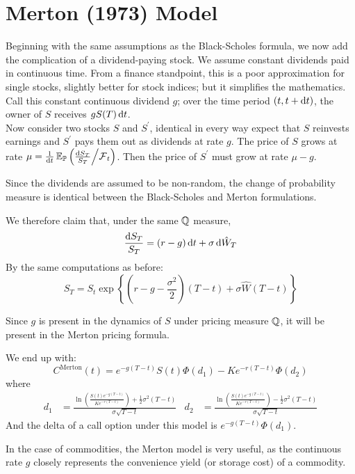\documentclass[11pt]{article}
\begin{document}
\section{Merton (1973) Model}
Beginning with the same assumptions as the Black-Scholes formula, we now add the complication of a dividend-paying stock. We assume constant dividends paid in continuous time. From a finance standpoint, this is a poor approximation for single stocks, slightly better for stock indices; but it simplifies the mathematics. Call this constant continuous dividend $g$; over the time period $(t, t + \dif t)$, the owner of $S$ receives $gS(T)\dif t$.\\

Now consider two stocks $S$ and $S^\prime$, identical in every way expect that $S$ reinvests earnings and $S^\prime$ pays them out as dividends at rate $g$. The price of $S$ grows at rate $\mu = \frac{1}{\dif t} \Exp_{\Pmeas} \left( \frac{\dif S_T}{S_T} \middle/ \Filtr_t\right)$. Then the price of $S^\prime$ must grow at rate $\mu  - g$.

\begin{remark}
Since the dividends are assumed to be non-random, the change of probability measure is identical between the Black-Scholes and Merton formulations.
\end{remark}
We therefore claim that, under the same $\operatorname{\mathbb Q}$ measure,
$$ \frac{\dif S_T}{S_T} = (r-g)\dif t + \sigma \dif \hat{W}_T$$
By the same computations as before:
$$S_T = S_t \exp \left\{ \left( r - g - \frac{\sigma^2}{2}\right)(T-t) + \sigma \hat{W}(T-t)\right\} $$
\begin{remark}
Since $g$ is present in the dynamics of $S$ under pricing measure $\operatorname{\mathbb Q}$, it will be present in the Merton pricing formula.
\end{remark}
We end up with:
$$C^{\text{Merton}}(t) = e^{-g(T-t)}S(t)\Phi(d_1) - Ke^{-r(T-t)}\Phi(d_2)$$
where
\begin{align*}
d_1 &= \frac{\ln \left( \frac{S(t)e^{-g(T-t)}}{Ke^{-r(T-t)}}\right) + \frac{1}{2}\sigma^2(T-t)}{\sigma \sqrt{T-t}} &
d_2 &= \frac{\ln \left( \frac{S(t)e^{-g(T-t)}}{Ke^{-r(T-t)}}\right) - \frac{1}{2}\sigma^2(T-t)}{\sigma \sqrt{T-t}}
\end{align*}
And the delta of a call option under this model is $e^{-g(T-t)}\Phi(d_1)$.
\begin{remark}
In the case of commodities, the Merton model is very useful, as the continuous rate $g$ closely represents the convenience yield (or storage cost) of a commodity.\end{remark}
\end{document}
